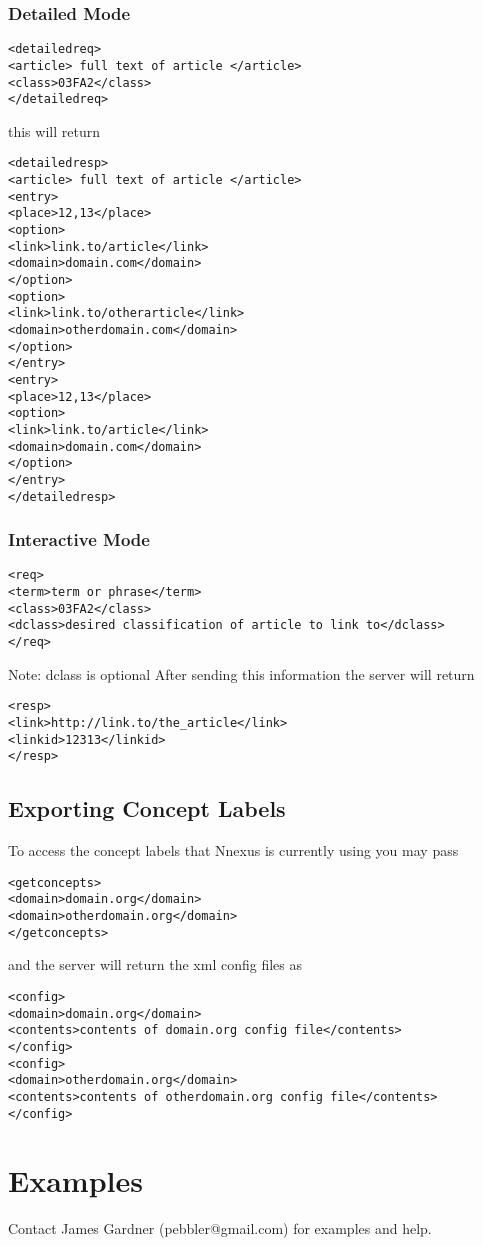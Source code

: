 \documentclass{article}
\begin{document}
\subsubsection{Detailed Mode}
\begin{verbatim}
<detailedreq>
<article> full text of article </article>
<class>03FA2</class>
</detailedreq>
\end{verbatim}
this will return
\begin{verbatim}
<detailedresp>
<article> full text of article </article>
<entry>
<place>12,13</place>
<option>
<link>link.to/article</link>
<domain>domain.com</domain>
</option>
<option>
<link>link.to/otherarticle</link>
<domain>otherdomain.com</domain>
</option>
</entry>
<entry>
<place>12,13</place>
<option>
<link>link.to/article</link>
<domain>domain.com</domain>
</option>
</entry>
</detailedresp>
\end{verbatim}

\subsubsection{Interactive Mode}
\begin{verbatim}
<req>
<term>term or phrase</term>
<class>03FA2</class>
<dclass>desired classification of article to link to</dclass>
</req>
\end{verbatim}
Note:  dclass is optional
After sending this information the server will return
\begin{verbatim}
<resp>
<link>http://link.to/the_article</link>
<linkid>12313</linkid>
</resp>
\end{verbatim}

\subsection{Exporting Concept Labels}
To access the concept labels that Nnexus is currently using you may pass
\begin{verbatim}
<getconcepts>
<domain>domain.org</domain>
<domain>otherdomain.org</domain>
</getconcepts>
\end{verbatim}
and the server will return the xml config files as
\begin{verbatim}
<config> 
<domain>domain.org</domain>
<contents>contents of domain.org config file</contents>
</config>
<config>
<domain>otherdomain.org</domain>
<contents>contents of otherdomain.org config file</contents>
</config>
\end{verbatim}

\section{Examples}
Contact James Gardner (pebbler@gmail.com) for examples and help.
\end{document}
